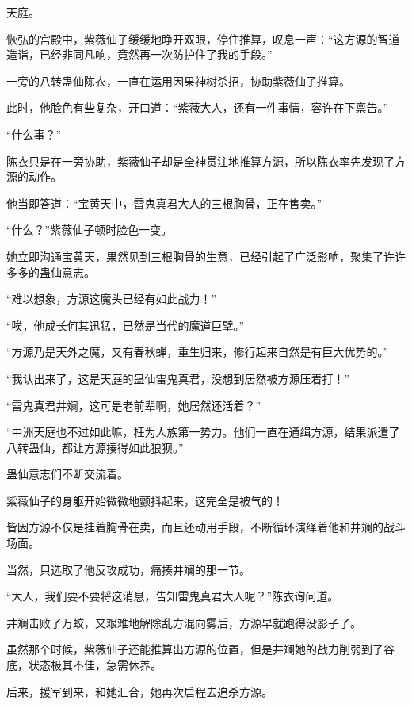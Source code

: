 
\begin{this_body}

天庭。

恢弘的宫殿中，紫薇仙子缓缓地睁开双眼，停住推算，叹息一声：“这方源的智道造诣，已经非同凡响，竟然再一次防护住了我的手段。”

一旁的八转蛊仙陈衣，一直在运用因果神树杀招，协助紫薇仙子推算。

此时，他脸色有些复杂，开口道：“紫薇大人，还有一件事情，容许在下禀告。”

“什么事？”

陈衣只是在一旁协助，紫薇仙子却是全神贯注地推算方源，所以陈衣率先发现了方源的动作。

他当即答道：“宝黄天中，雷鬼真君大人的三根胸骨，正在售卖。”

“什么？”紫薇仙子顿时脸色一变。

她立即沟通宝黄天，果然见到三根胸骨的生意，已经引起了广泛影响，聚集了许许多多的蛊仙意志。

“难以想象，方源这魔头已经有如此战力！”

“唉，他成长何其迅猛，已然是当代的魔道巨擘。”

“方源乃是天外之魔，又有春秋蝉，重生归来，修行起来自然是有巨大优势的。”

“我认出来了，这是天庭的蛊仙雷鬼真君，没想到居然被方源压着打！”

“雷鬼真君井斓，这可是老前辈啊，她居然还活着？”

“中洲天庭也不过如此嘛，枉为人族第一势力。他们一直在通缉方源，结果派遣了八转蛊仙，都让方源揍得如此狼狈。”

蛊仙意志们不断交流着。

紫薇仙子的身躯开始微微地颤抖起来，这完全是被气的！

皆因方源不仅是挂着胸骨在卖，而且还动用手段，不断循环演绎着他和井斓的战斗场面。

当然，只选取了他反攻成功，痛揍井斓的那一节。

“大人，我们要不要将这消息，告知雷鬼真君大人呢？”陈衣询问道。

井斓击败了万蛟，又艰难地解除乱方混向雾后，方源早就跑得没影子了。

虽然那个时候，紫薇仙子还能推算出方源的位置，但是井斓她的战力削弱到了谷底，状态极其不佳，急需休养。

后来，援军到来，和她汇合，她再次启程去追杀方源。


\end{this_body}
